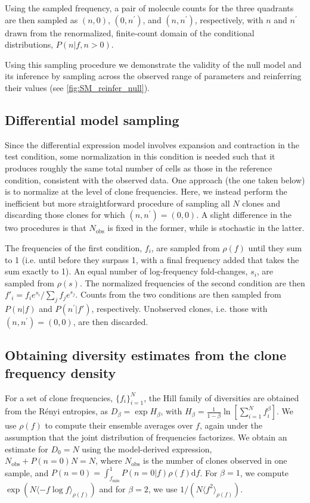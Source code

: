\documentclass[pre,twocolumn,english,longbibliography]{revtex4}
\newcommand{\<}{\langle}
\renewcommand{\>}{\rangle}
\begin{document}
Using the sampled frequency, a pair of molecule counts for the three quadrants are then sampled as $(n,0)$, $(0,n^{\prime})$, and $(n,n^{\prime})$, respectively, with $n$ and $n^{\prime}$ drawn from the renormalized, finite-count domain of the conditional distributions, $P(n|f,n>0)$. 

Using this sampling procedure we demonstrate the validity of the null model and its inference by sampling across the observed range of parameters and reinferring their values (see \cref{fig:SM_reinfer_null}).

\subsection*{Differential model sampling}\label{sec:diffexpr_sampling}
Since the differential expression model involves expansion and contraction in the test condition, some normalization in this condition is needed such that it produces roughly the same total number of cells as those in the reference condition, consistent with the observed data. One approach (the one taken below) is to normalize at the level of clone frequencies. 
Here, we instead perform the inefficient but more straightforward procedure of sampling all $N$ clones and discarding those clones for which $(n,n^{\prime})=(0,0)$. A slight difference in the two procedures is that $N_{\textrm{obs}}$ is fixed in the former, while is stochastic in the latter.

The frequencies of the first condition, $f_i$, are sampled from $\rho(f)$ until they sum to 1 (i.e. until before they surpass 1, with a final frequency added that takes the sum exactly to 1). An equal number of log-frequency fold-changes, $s_i$, are sampled from $\rho(s)$. The normalized frequencies of the second condition are then $f'_i=f_ie^{s_i}/\sum_j f_je^{s_j}$.  Counts from the two conditions are then sampled from $P(n|f)$ and $P(n^{\prime}|f')$, respectively. Unobserved clones, i.e. those with $(n,n^{\prime})=(0,0)$, are then discarded.

\subsection*{Obtaining diversity estimates from the clone frequency density}\label{sec:infer_div}
For a set of clone frequencies, $\{f_i\}_{i=1}^{N}$, the Hill family of diversities are obtained from the R\'enyi entropies, as $D_\beta=\exp H_\beta$, with $H_\beta=\frac{1}{1-\beta}\ln \left[ \sum_{i=1}^N f_i^{\beta}\right]$. We use $\rho(f)$ to compute their ensemble averages over $f$, again under the assumption that the joint distribution of frequencies factorizes. We obtain an estimate for $D_0=N$ using the model-derived expression, $N_{\textrm{obs}}+P(n=0)N=N$, where $N_{\textrm{obs}}$ is the number of clones observed in one sample, and $P(n=0)=\int_{f_{\textrm{min}}}^1 P(n=0|f)\rho(f)\textrm{d}f$. For $\beta=1$, we compute $\exp (N\langle -f\log f \rangle_{\rho(f)})$ and for $\beta=2$, we use $1/\left(N\langle f^2\rangle_{\rho(f)}\right)$.
\end{document}
